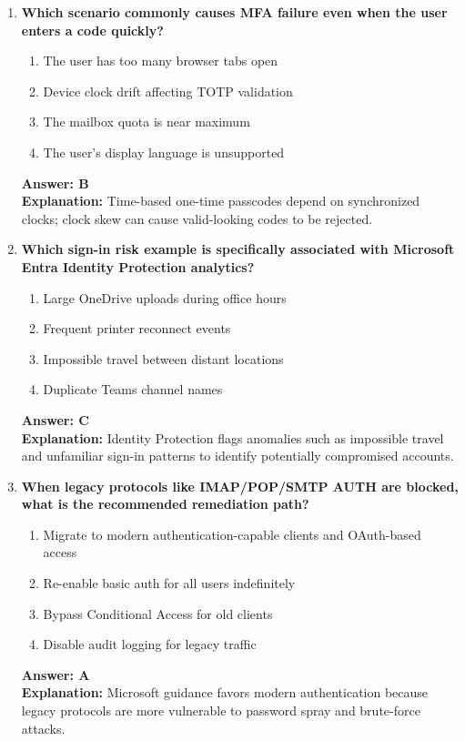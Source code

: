 \documentclass[10pt]{article}
\begin{document}
\begin{enumerate}[leftmargin=*]
\item \textbf{Which scenario commonly causes MFA failure even when the user enters a code quickly?}
\begin{enumerate}[label=\Alph*.]
  \item The user has too many browser tabs open
  \item Device clock drift affecting TOTP validation
  \item The mailbox quota is near maximum
  \item The user's display language is unsupported
\end{enumerate}
\textbf{Answer: B}\\
\textbf{Explanation:} Time-based one-time passcodes depend on synchronized clocks; clock skew can cause valid-looking codes to be rejected.

\item \textbf{Which sign-in risk example is specifically associated with Microsoft Entra Identity Protection analytics?}
\begin{enumerate}[label=\Alph*.]
  \item Large OneDrive uploads during office hours
  \item Frequent printer reconnect events
  \item Impossible travel between distant locations
  \item Duplicate Teams channel names
\end{enumerate}
\textbf{Answer: C}\\
\textbf{Explanation:} Identity Protection flags anomalies such as impossible travel and unfamiliar sign-in patterns to identify potentially compromised accounts.

\item \textbf{When legacy protocols like IMAP/POP/SMTP AUTH are blocked, what is the recommended remediation path?}
\begin{enumerate}[label=\Alph*.]
  \item Migrate to modern authentication-capable clients and OAuth-based access
  \item Re-enable basic auth for all users indefinitely
  \item Bypass Conditional Access for old clients
  \item Disable audit logging for legacy traffic
\end{enumerate}
\textbf{Answer: A}\\
\textbf{Explanation:} Microsoft guidance favors modern authentication because legacy protocols are more vulnerable to password spray and brute-force attacks.


\end{enumerate}
\end{document}
